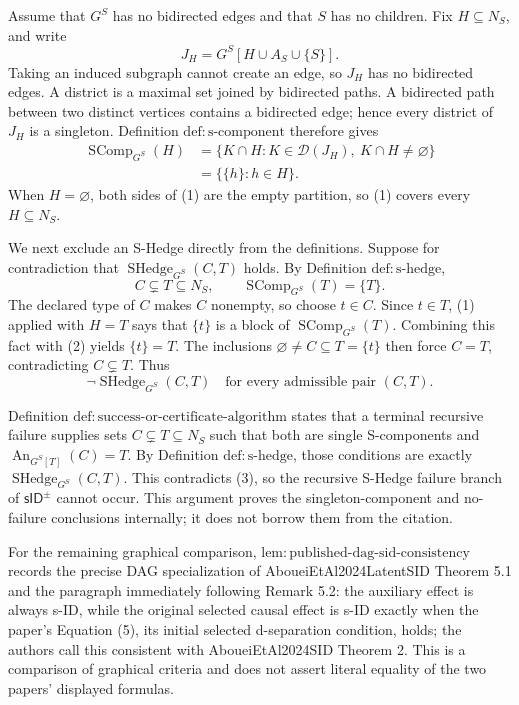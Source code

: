 Assume that \(G^S\) has no bidirected edges and that \(S\) has no children.  Fix \(H\subseteq N_S\), and write
\[
  J_H=G^S[H\cup A_S\cup\{S\}].
\]
Taking an induced subgraph cannot create an edge, so \(J_H\) has no bidirected edges.  A district is a maximal set joined by bidirected paths.  A bidirected path between two distinct vertices contains a bidirected edge; hence every district of \(J_H\) is a singleton.  Definition \(\mathrm{def:s\text{-}component}\) therefore gives
\[
\begin{aligned}
 \operatorname{SComp}_{G^S}(H)
 &=\bigl\{K\cap H:K\in\mathcal D(J_H),\ K\cap H\ne\varnothing\bigr\}\\
 &=\bigl\{\{h\}:h\in H\bigr\}. \tag{1}
\end{aligned}
\]
When \(H=\varnothing\), both sides of (1) are the empty partition, so (1) covers every \(H\subseteq N_S\).

We next exclude an S-Hedge directly from the definitions.  Suppose for contradiction that \(\operatorname{SHedge}_{G^S}(C,T)\) holds.  By Definition \(\mathrm{def:s\text{-}hedge}\),
\[
 C\subsetneq T\subseteq N_S,
 \qquad
 \operatorname{SComp}_{G^S}(T)=\{T\}. \tag{2}
\]
The declared type of \(C\) makes \(C\) nonempty, so choose \(t\in C\).  Since \(t\in T\), (1) applied with \(H=T\) says that \(\{t\}\) is a block of \(\operatorname{SComp}_{G^S}(T)\).  Combining this fact with (2) yields \(\{t\}=T\).  The inclusions \(\varnothing\ne C\subseteq T=\{t\}\) then force \(C=T\), contradicting \(C\subsetneq T\).  Thus
\[
  \neg\operatorname{SHedge}_{G^S}(C,T)
  \quad\text{for every admissible pair }(C,T). \tag{3}
\]

Definition \(\mathrm{def:success\text{-}or\text{-}certificate\text{-}algorithm}\) states that a terminal recursive failure supplies sets \(C\subsetneq T\subseteq N_S\) such that both are single S-components and \(\operatorname{An}_{G^S[T]}(C)=T\).  By Definition \(\mathrm{def:s\text{-}hedge}\), those conditions are exactly \(\operatorname{SHedge}_{G^S}(C,T)\).  This contradicts (3), so the recursive S-Hedge failure branch of \(\mathsf{sID}^{\pm}\) cannot occur.  This argument proves the singleton-component and no-failure conclusions internally; it does not borrow them from the citation.

For the remaining graphical comparison, \(\mathrm{lem:published\text{-}dag\text{-}sid\text{-}consistency}\) records the precise DAG specialization of AboueiEtAl2024LatentSID Theorem 5.1 and the paragraph immediately following Remark 5.2: the auxiliary effect is always s-ID, while the original selected causal effect is s-ID exactly when the paper's Equation (5), its initial selected d-separation condition, holds; the authors call this consistent with AboueiEtAl2024SID Theorem 2.  This is a comparison of graphical criteria and does not assert literal equality of the two papers' displayed formulas.

